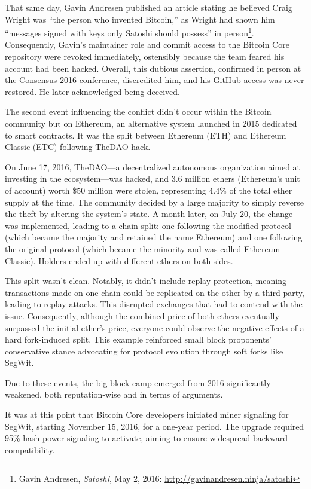 \documentclass[
  a5paper,
  smalldemyvopaper,10pt,twoside,onecolumn,openright,extrafontsizes,hidelinks]{memoir}
\begin{document}
That same day, Gavin Andresen published an article stating he believed
Craig Wright was ``the person who invented Bitcoin,'' as Wright had
shown him ``messages signed with keys only Satoshi should possess'' in
person\footnote{Gavin Andresen, \emph{Satoshi}, May 2, 2016:
  \url{http://gavinandresen.ninja/satoshi}}. Consequently, Gavin's
maintainer role and commit access to the Bitcoin Core repository were
revoked immediately, ostensibly because the team feared his account had
been hacked. Overall, this dubious assertion, confirmed in person at the
Consensus 2016 conference, discredited him, and his GitHub access was
never restored. He later acknowledged being deceived.

The second event influencing the conflict didn't occur within the
Bitcoin community but on Ethereum, an alternative system launched in
2015 dedicated to smart contracts. It was the split between Ethereum
(ETH) and Ethereum Classic (ETC) following TheDAO hack.

On June 17, 2016, TheDAO---a decentralized autonomous organization aimed
at investing in the ecosystem---was hacked, and 3.6 million ethers
(Ethereum's unit of account) worth \$50 million were stolen,
representing 4.4\% of the total ether supply at the time. The community
decided by a large majority to simply reverse the theft by altering the
system's state. A month later, on July 20, the change was implemented,
leading to a chain split: one following the modified protocol (which
became the majority and retained the name Ethereum) and one following
the original protocol (which became the minority and was called Ethereum
Classic). Holders ended up with different ethers on both sides.

This split wasn't clean. Notably, it didn't include replay protection,
meaning transactions made on one chain could be replicated on the other
by a third party, leading to replay attacks. This disrupted exchanges
that had to contend with the issue. Consequently, although the combined
price of both ethers eventually surpassed the initial ether's price,
everyone could observe the negative effects of a hard fork-induced
split. This example reinforced small block proponents' conservative
stance advocating for protocol evolution through soft forks like SegWit.

Due to these events, the big block camp emerged from 2016 significantly
weakened, both reputation-wise and in terms of arguments.

It was at this point that Bitcoin Core developers initiated miner
signaling for SegWit, starting November 15, 2016, for a one-year period.
The upgrade required 95\% hash power signaling to activate, aiming to
ensure widespread backward compatibility.
\end{document}
